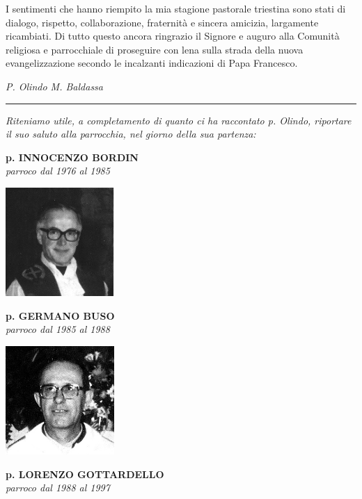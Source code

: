 I sentimenti che hanno riempito la mia stagione pastorale triestina sono stati di dialogo, rispetto, collaborazione, fraternità e sincera amicizia, largamente ricambiati. Di tutto questo ancora ringrazio il Signore e auguro alla Comunità religiosa e parrocchiale di proseguire con lena sulla strada della nuova evangelizzazione secondo le incalzanti indicazioni di Papa Francesco. 
\begin{flushright}
\textit{P. Olindo M. Baldassa}
\end{flushright}
\endgroup
\begin{center}
	\noindent\rule{\textwidth}{0.4pt}
\end{center}
\textit{Riteniamo utile, a completamento di quanto ci ha raccontato p. Olindo, riportare il suo saluto alla parrocchia, nel giorno della sua partenza:}
\bigskip

\newpage
\begin{center}
\textbf{\Large p. INNOCENZO BORDIN}\\
	\textit{parroco dal 1976 al 1985}
\end{center}
\includegraphics[width=0.31\textwidth]{immagini/bordin.jpg}
\vfill
\begin{center}
\textbf{\Large p. GERMANO BUSO}\\
	\textit{parroco dal 1985 al 1988}
\end{center}
\includegraphics[width=0.31\textwidth]{immagini/buso.jpg}
\vfill
\newpage
\begin{center}
\textbf{\Large p. LORENZO GOTTARDELLO}\\
	\textit{parroco dal 1988 al 1997}
\end{center}
\bigbreak
\begingroup
\setlength\intextsep{0pt}
